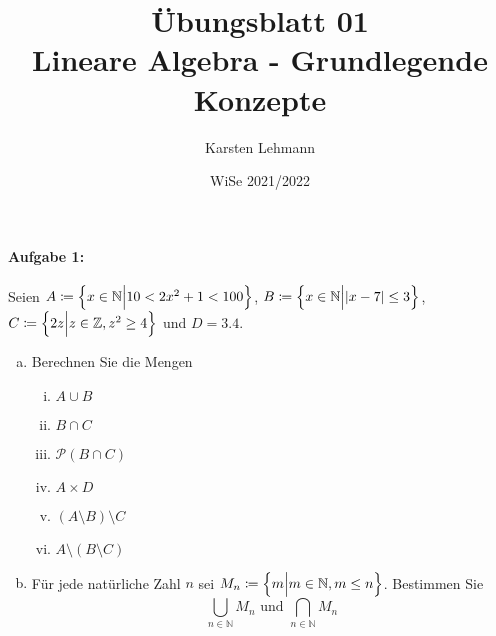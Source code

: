 \documentclass{scrreprt}
\author{Karsten Lehmann}
\date{WiSe 2021/2022}
\title{Übungsblatt 01\\Lineare Algebra - Grundlegende Konzepte}
\begin{document}
\paragraph{Aufgabe 1:} Seien
$A \coloneqq \qty{x \in \mathbb{N} {\Big |} 10 < 2x^2 + 1 < 100}$,
$B \coloneqq \qty{x \in \mathbb{N} {\Big |} \abs{x - 7} \leq 3}$,
$C \coloneqq \qty{ 2z {\Big |} z \in \mathbb{Z}, z^2 \geq 4}$ und
$D = \qty{3, 4}$.

\begin{enumerate}[(a)]
\item Berechnen Sie die Mengen
  \begin{multicols}{3}
    \begin{enumerate}[(i)]
    \item $A \cup B$
    \item $B \cap C$
    \item $\mathcal{P}(B \cap C)$
    \item $A \times D$
    \item $(A \setminus B) \setminus C$
    \item $A \setminus (B \setminus C)$
    \end{enumerate}
  \end{multicols}

\item Für jede natürliche Zahl $n$ sei
  $M_n \coloneqq \qty{ m {\Big |} m \in \mathbb{N}, m \leq n }$.
  Bestimmen Sie
  \[
    \bigcup_{n \in \mathbb{N}}M_n \text{ und } \bigcap_{n \in \mathbb{N}} M_n
  \]
\end{enumerate}
\end{document}
